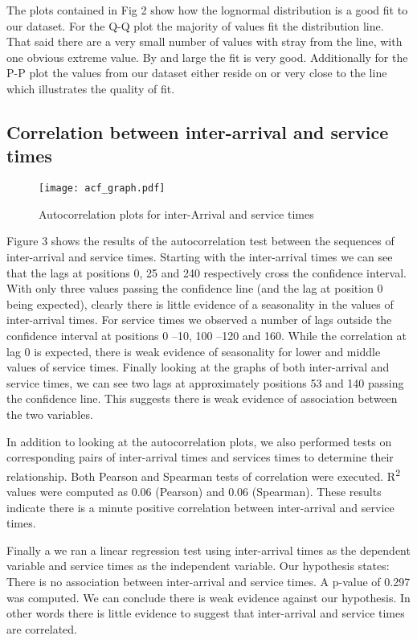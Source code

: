 \documentclass[5p]{elsarticle}
\begin{document}
The plots contained in Fig 2 show how the lognormal distribution is a good fit to our dataset. For the Q-Q plot the majority of values fit the distribution line. That said there are a very small number of values with stray from the line, with one obvious extreme value. By and large the fit is very good. Additionally for the P-P plot the values from our dataset either reside on or very close to the line which illustrates the quality of fit.

\subsection{Correlation between inter-arrival and service times}

\begin{figure*}[]
\begin{center}
\texttt{[image: acf\_graph.pdf]} 
\caption{Autocorrelation plots for inter-Arrival and service times}
\end{center}
\label{fig:acfgraphs}
\end{figure*}

Figure 3 shows the results of the autocorrelation test between the sequences of inter-arrival and service times. Starting with the inter-arrival times we can see that the lags at positions 0, 25 and 240 respectively cross the confidence interval. With only three values passing the confidence line (and the lag at position 0 being expected), clearly there is little evidence of a seasonality in the values of inter-arrival times. For service times we observed a number of lags outside the confidence interval at positions 0 --10, 100 --120 and 160. While the correlation at lag 0 is expected, there is weak evidence of seasonality for lower and middle values of service times. Finally looking at the graphs of both inter-arrival and service times, we can see two lags at approximately positions 53 and 140 passing the confidence line. This suggests there is weak evidence of association between the two variables.

In addition to looking at the autocorrelation plots, we also performed tests on corresponding pairs of inter-arrival times and services times to determine their relationship. Both Pearson and Spearman tests of correlation were executed. R\textsuperscript{2} values were computed as 0.06 (Pearson) and 0.06 (Spearman). These results indicate there is a minute positive correlation between inter-arrival and service times.

Finally a we ran a linear regression test using inter-arrival times as the dependent variable and service times as the independent variable. Our hypothesis states: There is no association between inter-arrival and service times. A p-value of 0.297 was computed. We can conclude there is weak evidence against our hypothesis. In other words there is little evidence to suggest that inter-arrival and service times are correlated. 
\end{document}
